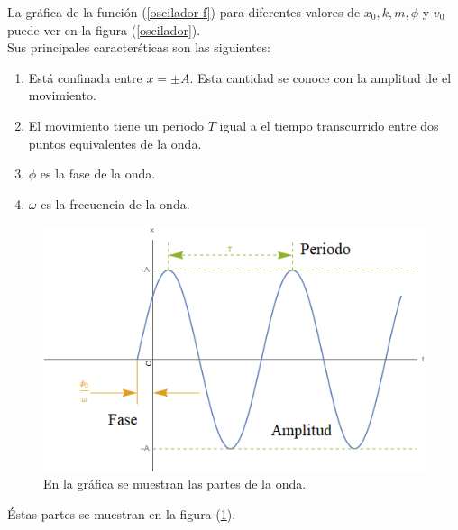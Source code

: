 \documentclass[letterpaper,12pt,oneside]{book}
\begin{document}
%
La gr\'afica de la funci\'on (\ref{oscilador-f}) para diferentes valores de $x_0,  k,  m,  \phi$ y $v_0$ puede ver en la figura (\ref{oscilador}).\\
Sus principales caracter\'sticas son las siguientes:
%
\begin{enumerate}
  \item Est\'a confinada entre $x= \pm A$. Esta cantidad se conoce con la amplitud de el movimiento.
  \item El movimiento tiene un periodo $T$ igual a el tiempo transcurrido entre dos puntos equivalentes de la onda.
  \item $\phi$ es la fase de la onda.
  \item $\omega$ es la frecuencia de la onda.
\end{enumerate}
%
\begin{figure}
\centering
\includegraphics[scale=0.8]{onda}
\caption{\label{onda}  En la gr\'afica se muestran las partes de la onda.  }
\end{figure}
% 
\'Estas partes se muestran en la figura (\ref{onda}).

%
\end{document}
